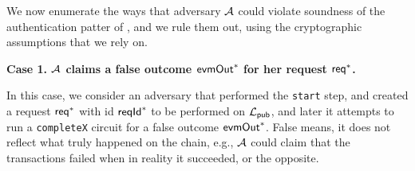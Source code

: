 We now enumerate the ways that adversary $\mathcal{A}$ could violate soundness of the authentication patter of  , and we rule them out, using  the cryptographic assumptions that we rely on.


\vspace{8pt}
\noindent
\textbf{Case 1. $\mathcal{A}$ claims a false outcome  $\mathsf{evmOut}^*$ for her request $\mathsf{req}^*$.}

In this case, we consider an adversary that performed the \texttt{start} step, and created a request $\mathsf{req}^*$ with id $\mathsf{reqId}^*$ to be performed on $\mathcal{L}_{\mathsf{pub}}$, and later it attempts to run a \texttt{completeX} circuit for a false outcome $\mathsf{evmOut}^*$. False means, it does not reflect what truly happened on the chain, e.g., $\mathcal{A}$ could claim that the transactions failed when in reality it succeeded, or the opposite.

